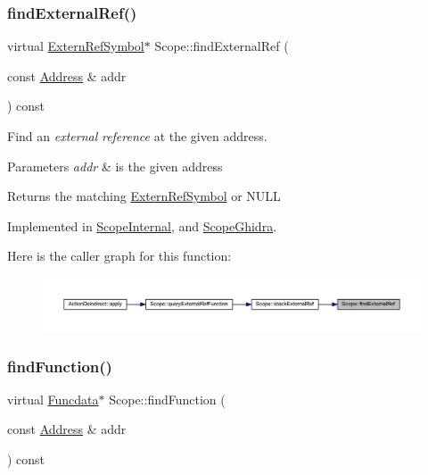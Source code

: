 \subsubsection{\texorpdfstring{findExternalRef()}{findExternalRef()}}
{\footnotesize\ttfamily virtual \mbox{\hyperlink{class_extern_ref_symbol}{Extern\+Ref\+Symbol}}$\ast$ Scope\+::find\+External\+Ref (\begin{DoxyParamCaption}\item[{const \mbox{\hyperlink{class_address}{Address}} \&}]{addr }\end{DoxyParamCaption}) const\hspace{0.3cm}{\ttfamily [pure virtual]}}



Find an {\itshape external} {\itshape reference} at the given address. 


\begin{DoxyParams}{Parameters}
{\em addr} & is the given address \\
\hline
\end{DoxyParams}
\begin{DoxyReturn}{Returns}
the matching \mbox{\hyperlink{class_extern_ref_symbol}{Extern\+Ref\+Symbol}} or N\+U\+LL 
\end{DoxyReturn}


Implemented in \mbox{\hyperlink{class_scope_internal_a7e440965cfb5642bcc751a622e5ec58d}{Scope\+Internal}}, and \mbox{\hyperlink{class_scope_ghidra_a0de8e7d9e97f48516f8bb7b5edd4dfcd}{Scope\+Ghidra}}.

Here is the caller graph for this function\+:
\nopagebreak
\begin{figure}[H]
\begin{center}
\leavevmode
\includegraphics[width=350pt]{class_scope_af69e0f77b621a3ba6436f8a1c0010d1c_icgraph}
\end{center}
\end{figure}
\mbox{\label{class_scope_a2c621196f6fdb4b8ce4ee1f3dc953107}} 
\subsubsection{\texorpdfstring{findFunction()}{findFunction()}}
{\footnotesize\ttfamily virtual \mbox{\hyperlink{class_funcdata}{Funcdata}}$\ast$ Scope\+::find\+Function (\begin{DoxyParamCaption}\item[{const \mbox{\hyperlink{class_address}{Address}} \&}]{addr }\end{DoxyParamCaption}) const\hspace{0.3cm}{\ttfamily [pure virtual]}}



